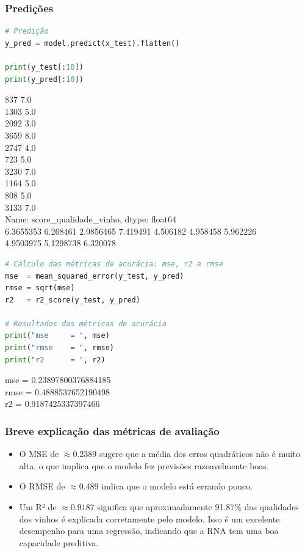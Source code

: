 \subsubsection*{Predições}
\begin{lstlisting}[language=Python, style=input]
# Predição
y_pred = model.predict(x_test).flatten()

print(y_test[:10])
print(y_pred[:10])
\end{lstlisting}
\begin{tcolorbox}[myoutputstyle]
837     7.0\\
1303    5.0\\
2092    3.0\\
3659    8.0\\
2747    4.0\\
723     5.0\\
3230    7.0\\
1164    5.0\\
808     5.0\\
3133    7.0\\
Name: score\_qualidade\_vinho, dtype: float64\\
6.3655353 6.268461  2.9856465 7.419491  4.506182  4.958458  5.962226\\
 4.9503975 5.1298738 6.320078
\end{tcolorbox}
\begin{lstlisting}[language=Python, style=input]
# Cálculo das métricas de acurácia: mse, r2 e rmse
mse  = mean_squared_error(y_test, y_pred)
rmse = sqrt(mse)
r2   = r2_score(y_test, y_pred)

# Resultados das métricas de acurácia
print("mse     = ", mse)
print("rmse    = ", rmse)
print("r2      = ", r2)
\end{lstlisting}
\begin{tcolorbox}[myoutputstyle]
mse     =  0.23897800376884185\\
rmse    =  0.4888537652190498\\
r2      =  0.9187425337397466
\end{tcolorbox}
\subsubsection*{Breve explicação das métricas de avaliação}

\begin{itemize}
    \item O MSE de $\approx0.2389$ sugere que a média dos erros quadráticos não é muito alta, o que implica que o modelo fez previsões razoavelmente boas.
    \item O RMSE de $\approx0.489$ indica que o modelo está errando pouco.
    \item Um R² de $\approx0.9187$ significa que aproximadamente 91.87\% das qualidades dos vinhos é explicada corretamente pelo modelo. Isso é um excelente desempenho para uma regressão, indicando que a RNA tem uma boa capacidade preditiva.
\end{itemize}


